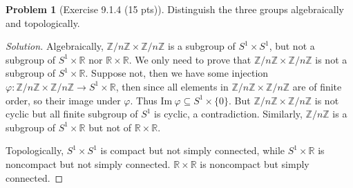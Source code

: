 \documentclass{article}
\theoremstyle{definition}
\newtheorem{problem}{Problem}
\theoremstyle{plain}
\begin{document}
\begin{problem}[Exercise 9.1.4 (15 pts)]
Distinguish the three groups algebraically and topologically.
\end{problem}
\begin{adjustwidth}{0.7cm}{}
\color{blue}
\begin{proof}[Solution]
Algebraically, $\mathbb{Z}/n\mathbb{Z}\times\mathbb{Z}/n\mathbb{Z}$ is a subgroup of $S^1\times S^1$, but not a subgroup of $S^1\times\mathbb{R}$ nor $\mathbb{R}\times\mathbb{R}$. We only need to prove that $\mathbb{Z}/n\mathbb{Z}\times\mathbb{Z}/n\mathbb{Z}$ is not a subgroup of $S^1\times\mathbb{R}$. Suppose not, then we have some injection $\varphi:\mathbb{Z}/n\mathbb{Z}\times\mathbb{Z}/n\mathbb{Z}\to S^1\times\mathbb{R}$, then since all elements in $\mathbb{Z}/n\mathbb{Z}\times\mathbb{Z}/n\mathbb{Z}$ are of finite order, so their image under $\varphi$. Thus $\mathrm{Im}~\varphi\subseteq S^1\times\{0\}$. But $\mathbb{Z}/n\mathbb{Z}\times\mathbb{Z}/n\mathbb{Z}$ is not cyclic but all finite subgroup of $S^1$ is cyclic, a contradiction. Similarly, $\mathbb{Z}/n\mathbb{Z}$ is a subgroup of $S^1\times\mathbb{R}$ but not of $\mathbb{R}\times\mathbb{R}$.\par
Topologically, $S^1\times S^1$ is compact but not simply connected, while $S^1\times\mathbb{R}$ is noncompact but not simply connected. $\mathbb{R}\times\mathbb{R}$ is noncompact but simply connected.
\color{black}
\end{proof}
\end{adjustwidth}
\end{document}
